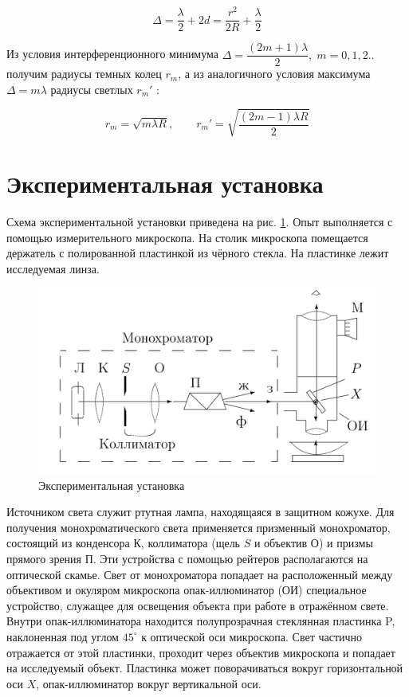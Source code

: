 \documentclass[a4paper,12pt]{article}
\begin{document}
	\begin{equation}\label{r_m}
	\Delta = \dfrac{\lambda}{2} + 2d = \dfrac{r^2}{2R} + \dfrac{\lambda}{2}
	\end{equation}
	
	Из условия интерференционного минимума $ \Delta = \dfrac{(2m +1)\lambda}{2}, \; m =0, 1, 2.. $ получим радиусы темных колец $ r_m $, а из аналогичного условия максимума $ \Delta = m \lambda $ радиусы светлых $ r_m' $ :
	
	\begin{equation}\label{r_m'}
	r_m = \sqrt{m \lambda R}, \qquad 	r_m' = \sqrt{\dfrac{(2m-1) \lambda R}{2}}
	\end{equation}
	
\newpage

\section*{Экспериментальная установка}

Схема экспериментальной установки приведена на рис. \ref{lab}. Опыт выполняется с помощью измерительного микроскопа.
На столик микроскопа помещается держатель с полированной пластинкой из
чёрного стекла. На пластинке лежит исследуемая линза.


	\begin{figure} 
	\includegraphics[width=\linewidth]{fig1}
	\caption{Экспериментальная установка}
	\label{lab}
\end{figure}

Источником света служит ртутная лампа, находящаяся в защитном кожухе. Для получения монохроматического света применяется призменный монохроматор, состоящий из конденсора $ К $, коллиматора (щель $ S $ и объектив $ О $) и призмы прямого зрения $ П $. Эти устройства с помощью рейтеров располагаются на оптической скамье. Свет от монохроматора попадает на расположенный между объективом и окуляром микроскопа опак-иллюминатор (ОИ)  специальное устройство, служащее для освещения объекта при работе в отражённом свете. Внутри опак-иллюминатора находится полупрозрачная стеклянная пластинка P, наклоненная под углом $ 45^\circ $ к оптической оси микроскопа. Свет частично отражается от этой пластинки, проходит через объектив микроскопа и попадает на исследуемый объект. Пластинка может поворачиваться вокруг горизонтальной оси $ X $, опак-иллюминатор вокруг вертикальной оси.
\end{document}
